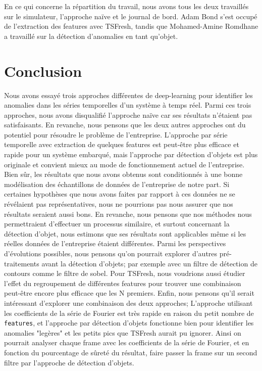 \documentclass[french]{article}
\theoremstyle{mytheoremstyle}
\theoremstyle{mytheoremstyle}
\theoremstyle{myproblemstyle}
\begin{document}
    En ce qui concerne la répartition du travail, nous avons tous les deux travaillés sur le simulateur, l'approche naïve et le journal de bord. Adam Bond s'est occupé de l'extraction des features avec TSFresh, tandis que Mohamed-Amine Romdhane a travaillé sur la détection d'anomalies en tant qu'objet.
    
    
    
    
    \section{Conclusion}
    Nous avons essayé trois approches différentes de deep-learning pour identifier les anomalies dans les séries temporelles d'un système à temps réel. Parmi ces trois approches, nous avons disqualifié l'approche naïve car ses résultats n'étaient pas satisfaisants.
    En revanche, nous pensons que les deux autres approches ont du potentiel pour résoudre le problème de l'entreprise. L'approche par série temporelle avec extraction de quelques features est peut-être plus efficace et rapide pour un système embarqué, mais l'approche par détection d'objets est plus originale et convient mieux au mode de fonctionnement actuel de l'entreprise.
    Bien sûr, les résultats que nous avons obtenus sont conditionnés à une bonne modélisation des échantillons de données de l'entreprise de notre part. Si certaines hypothèses que nous avons faites par rapport à ces données ne se révélaient pas représentatives, nous ne pourrions pas nous assurer que nos résultats seraient aussi bons. En revanche, nous pensons que nos méthodes nous permettraient d'effectuer un processus similaire, et surtout concernant la détection d'objet, nous estimons que ses résultats sont applicables même si les réelles données de l'entreprise étaient différentes.
	    Parmi les perspectives d'évolutions possibles, nous pensons qu'on pourrait explorer d'autres pré-traitements avant la détection d'objets; par exemple avec un filtre de détection de contours comme le filtre de sobel\cite{sobel}. Pour TSFresh, nous voudrions aussi étudier l'effet du regroupement de différentes features pour trouver une combinaison peut-être encore plus efficace que les N premiers.
	    Enfin, nous pensons qu'il serait intéressant d'explorer une combinaison des deux approches; L'approche utilisant les coefficients de la série de Fourier est très rapide en raison du petit nombre de \texttt{features}, et l'approche par détection d'objets fonctionne bien pour identifier les anomalies "legères" et les petits pics que TSFresh aurait pu ignorer. Ainsi on pourrait analyser chaque frame avec les coefficients de la série de Fourier, et en fonction du pourcentage de sûreté du résultat, faire passer la frame sur un second filtre par l'approche de détection d'objets.
\end{document}
